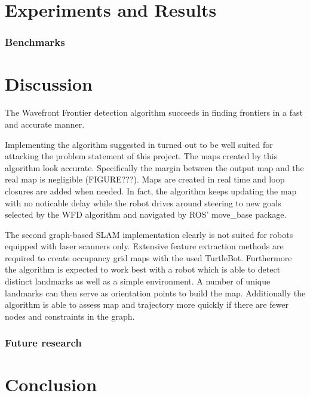 \documentclass{ba-kecs}
\begin{document}
\section{Experiments and Results}
\subsubsection{Benchmarks}

\section{Discussion}
The Wavefront Frontier detection algorithm \citep{Keidar} succeeds in finding frontiers in a fast and accurate manner.

Implementing the algorithm suggested in \citep{Grisetti} turned out to be well suited for attacking the problem statement of this project. The maps created by this algorithm look accurate. Specifically the margin between the output map and the real map is negligible (FIGURE???). Maps are created in real time and loop closures are added when needed. In fact, the algorithm keeps updating the map with no noticable delay while the robot drives around steering to new goals selected by the WFD algorithm and navigated by ROS' move\_base package.

The second graph-based SLAM implementation \cite{Thrun} clearly is not suited for robots equipped with laser scanners only. Extensive feature extraction methods are required to create occupancy grid maps with the used TurtleBot. Furthermore the algorithm is expected to work best with a robot which is able to detect distinct landmarks as well as a simple environment. A number of unique landmarks can then serve as orientation points to build the map. Additionally the algorithm is able to assess map and trajectory more quickly if there are fewer nodes and constraints in the graph.

\subsubsection{Future research}

\section{Conclusion}


\nocite{*}
\onecolumn
\appendix
\end{document}
